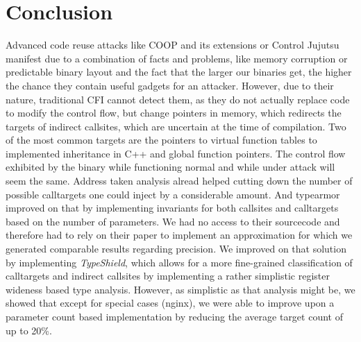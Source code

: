 \section{Conclusion}
\label{chapter:Conclusion}
Advanced code reuse attacks like COOP and its extensions or Control Jujutsu manifest due to a combination of facts and problems, 
like memory corruption or predictable binary layout and the fact that the larger our binaries get, the 
higher the chance they contain useful gadgets for an attacker. However, due to their nature, traditional 
CFI cannot detect them, as they do not actually replace code to modify the control flow, but change pointers
in memory, which redirects the targets of indirect callsites, which are uncertain at the time of compilation. 
Two of the most common targets are the pointers to virtual function tables to implemented inheritance in C++ 
and global function pointers. The control flow exhibited by the binary while functioning normal and while 
under attack will seem the same. Address taken analysis alread helped cutting down the number of possible 
calltargets one could inject by a considerable amount. And typearmor improved on that by implementing 
invariants for both callsites and calltargets based on the number of parameters. We had no access to
their sourcecode and therefore had to rely on their paper to implement an approximation for which 
we generated comparable results regarding precision. We improved on that solution by implementing \textit{TypeShield}, 
which allows for a more fine-grained classification of calltargets and indirect callsites by implementing a rather 
simplistic register wideness based type analysis. However, as simplistic as that analysis might be, we showed that 
except for special cases (nginx), we were able to improve upon a parameter count based implementation by reducing 
the average target count of up to 20\%.


